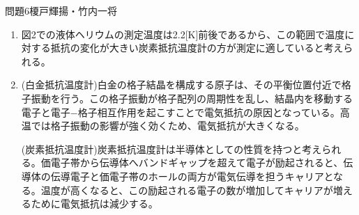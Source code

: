\documentclass[fleqn]{jbook}
\begin{document}
\begin{answer}{問題6}{榎戸輝揚・竹内一将}
\begin{enumerate}
密度$\rho$はギブスの自由エネルギー$G$と$\rho \propto \frac{N}{V} \propto \frac{1}{\frac{\partial G}{\partial p}}$の関係にあり、
$T=T_0$に密度のカスプがあることから、ギブス自由エネルギーは1階微分にカスプがあり、$T_0$に2次相転移点を持つことが予想される。
実際、液体ヘリウム$^4\mathrm{He}$は$T_0=2.2[\mathrm{K}]$が$\lambda$点と呼ばれる2次の相転移点であることが知られており、
これを境にして高温側は$\mathrm{He}$Ⅰと呼ばれる常流動相、低温側は$\mathrm{He}$Ⅱと呼ばれる超流動相であるので、これが密度の温度依存性の由来であると考えられる。

\item
図2での液体ヘリウムの測定温度は2.2[K]前後であるから、この範囲で温度に対する抵抗の変化が大きい炭素抵抗温度計の方が測定に適していると考えられる。

\item
(白金抵抗温度計)白金の格子結晶を構成する原子は、その平衡位置付近で格子振動を行う。この格子振動が格子配列の周期性を乱し、結晶内を移動する電子と電子−格子相互作用を起こすことで電気抵抗の原因となっている。高温では格子振動の影響が強く効くため、電気抵抗が大きくなる。\par
(炭素抵抗温度計)炭素抵抗温度計は半導体としての性質を持つと考えられる。価電子帯から伝導体へバンドギャップを超えて電子が励起されると、伝導体の伝導電子と価電子帯のホールの両方が電気伝導を担うキャリアとなる。温度が高くなると、この励起される電子の数が増加してキャリアが増えるために電気抵抗は減少する。


\end{enumerate}
\end{answer}
\end{document}
